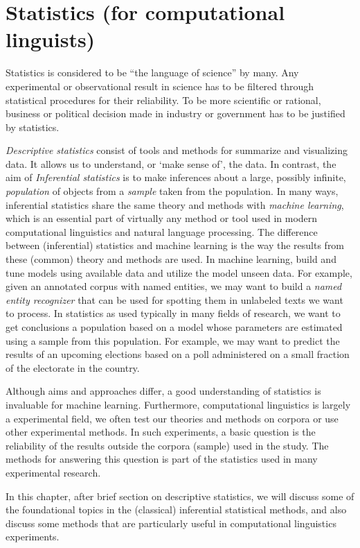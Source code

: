\chapter{\label{chap:stats}Statistics (for computational linguists)}

Statistics is considered to be ``the language of science'' by many.
Any experimental or observational result in science has to be
filtered through statistical procedures for their reliability.
To be more scientific or rational,
business or political decision made in industry or government
has to be justified by statistics.

\emph{Descriptive statistics} consist of tools and methods
for summarize and visualizing data.
It allows us to understand, or `make sense of', the data.
In contrast, the aim of \emph{Inferential statistics} is
to make inferences about a large, possibly infinite,
\emph{population} of objects from a \emph{sample} taken from the population.
In many ways,
inferential statistics share the same theory and methods with
\emph{machine learning},
which is an essential part of virtually any method or tool used
in modern computational linguistics and natural language processing.
The difference between (inferential) statistics and machine learning is
the way the results from these (common) theory and methods are used.
In machine learning,
build and tune models using available data and utilize the model unseen data.
For example,
given an annotated corpus with named entities,
we may want to build a \emph{named entity recognizer} that can be used for spotting them in unlabeled texts we want to process.
In statistics as used typically in many fields of research,
we want to get conclusions a population based on
a model whose parameters are estimated using a sample from this population.
For example,
we may want to predict the results of an upcoming elections based on
a poll administered on a small fraction of the electorate in the country.

Although aims and approaches differ,
a good understanding of statistics is invaluable for machine learning.
Furthermore,
computational linguistics is largely a experimental field,
we often test our theories and methods on corpora
or use other experimental methods.
In such experiments,
a basic question is the reliability of the results outside
the corpora (sample) used in the study.
The methods for answering this question is part of the 
statistics used in many experimental research.

In this chapter,
after brief section on descriptive statistics,
we will discuss some of the foundational topics
in the (classical) inferential statistical methods,
and also discuss some methods that are particularly useful
in computational linguistics experiments.

